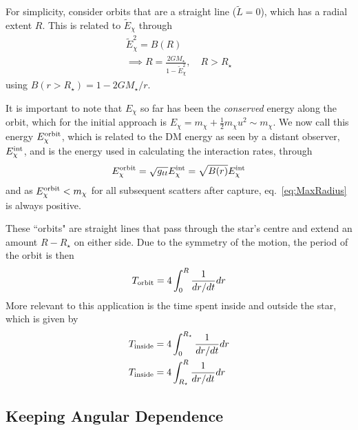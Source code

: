 
For simplicity, consider orbits that are a straight line ($\tilde L = 0$), which has a radial extent $R$. This is related to $\tilde E_\chi$ through
\begin{gather}
    \tilde E_\chi^2 = B(R)\label{eq:maxradgeneral}\\
    \implies R = \frac{2 G M_\star}{1 - \tilde E_\chi^2}, \quad R>R_\star
    \label{eq:MaxRadius}
\end{gather}
using $B(r>R_\star) = 1 - 2 G M_\star /r$.

It is important to note that $E_\chi$ so far has been the \textit{conserved} energy along the orbit, which for the initial approach is $E_\chi = m_\chi + \frac{1}{2}m_\chi u^2\sim m_\chi$. We now call this energy $E_\chi^{\rm orbit}$, which is related to the DM energy as seen by a distant observer, $E_\chi^{\rm int}$, and is the energy used in calculating the interaction rates, through 
\begin{equation}
    E_\chi^{\rm orbit} = \sqrt{g_{tt}} E_\chi^{\rm int} = \sqrt{B(r)}E_\chi^{\rm int}
\end{equation}
and as $E_\chi^{\rm orbit} < m_\chi$ for all subsequent scatters after capture, eq.~\ref{eq:MaxRadius} is always positive.

These ``orbits" are straight lines that pass through the star's centre and extend an amount $R - R_\star$ on either side. Due to the symmetry of the motion, the period of the orbit is then
\begin{equation}
    T_{\rm orbit} = 4 \int_0^R \frac{1}{dr/dt}dr
\end{equation}
More relevant to this application is the time spent inside and outside the star, which is given by
\begin{align}
    T_{\rm inside} & = 4 \int_0^{R_\star} \frac{1}{dr/dt}dr\label{eq:timeinside}\\
    T_{\rm inside} & = 4 \int_{R_\star}^R \frac{1}{dr/dt}dr\label{eq:timeoutside}
\end{align}

\subsection{Keeping Angular Dependence}


